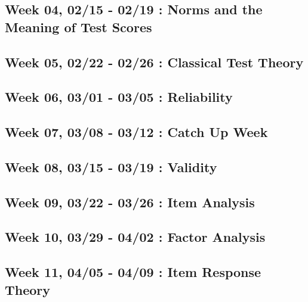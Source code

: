 \documentclass[
]{book}
\begin{document}
\hypertarget{week-04-0215---0219-norms-and-the-meaning-of-test-scores}{%
\subsection{Week 04, 02/15 - 02/19 : Norms and the Meaning of Test Scores}\label{week-04-0215---0219-norms-and-the-meaning-of-test-scores}}

\hypertarget{week-05-0222---0226-classical-test-theory}{%
\subsection{Week 05, 02/22 - 02/26 : Classical Test Theory}\label{week-05-0222---0226-classical-test-theory}}

\hypertarget{week-06-0301---0305-reliability}{%
\subsection{Week 06, 03/01 - 03/05 : Reliability}\label{week-06-0301---0305-reliability}}

\hypertarget{week-07-0308---0312-catch-up-week}{%
\subsection{Week 07, 03/08 - 03/12 : Catch Up Week}\label{week-07-0308---0312-catch-up-week}}

\hypertarget{week-08-0315---0319-validity}{%
\subsection{Week 08, 03/15 - 03/19 : Validity}\label{week-08-0315---0319-validity}}

\hypertarget{week-09-0322---0326-item-analysis}{%
\subsection{Week 09, 03/22 - 03/26 : Item Analysis}\label{week-09-0322---0326-item-analysis}}

\hypertarget{week-10-0329---0402-factor-analysis}{%
\subsection{Week 10, 03/29 - 04/02 : Factor Analysis}\label{week-10-0329---0402-factor-analysis}}

\hypertarget{week-11-0405---0409-item-response-theory}{%
\subsection{Week 11, 04/05 - 04/09 : Item Response Theory}\label{week-11-0405---0409-item-response-theory}}
\end{document}
